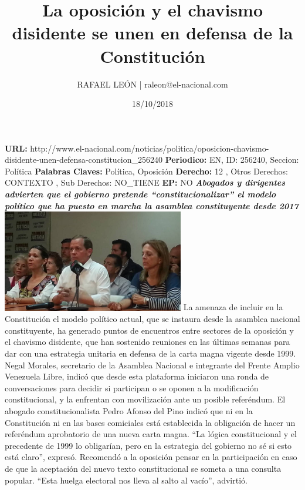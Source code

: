 \documentclass{article}%
\title{\textbf{La oposición y el chavismo disidente se unen en defensa de la Constitución}}%
\author{RAFAEL LEÓN | raleon@el{-}nacional.com}%
\date{18/10/2018}%
\begin{document}
%
\normalsize%
\maketitle%
\textbf{URL: }%
http://www.el{-}nacional.com/noticias/politica/oposicion{-}chavismo{-}disidente{-}unen{-}defensa{-}constitucion\_256240\newline%
%
\textbf{Periodico: }%
EN, %
ID: %
256240, %
Seccion: %
Política\newline%
%
\textbf{Palabras Claves: }%
Política, Oposición\newline%
%
\textbf{Derecho: }%
12%
, Otros Derechos: %
CONTEXTO%
, Sub Derechos: %
NO\_TIENE%
\newline%
%
\textbf{EP: }%
NO\newline%
\newline%
%
\textbf{\textit{Abogados y dirigentes advierten que el gobierno pretende “constitucionalizar” el modelo político que ha puesto en marcha la asamblea constituyente desde 2017}}%
\newline%
\newline%
%
\includegraphics[width=300px]{98.jpg}%
\newline%
%
La amenaza de incluir en la Constitución el modelo político actual, que se instaura desde la asamblea nacional constituyente, ha generado puntos de encuentros entre sectores de la oposición y el chavismo disidente, que han sostenido reuniones en las últimas semanas para dar con una estrategia unitaria en defensa de la carta magna vigente desde 1999.%
\newline%
%
Negal Morales, secretario de la Asamblea Nacional e integrante del Frente Amplio Venezuela Libre, indicó que desde esta plataforma iniciaron una ronda de conversaciones para decidir si participan o se oponen a la modificación constitucional, y la enfrentan con movilización ante un posible referéndum.%
\newline%
%
El abogado constitucionalista Pedro Afonso del Pino indicó que ni en la Constitución ni en las bases comiciales está establecida la obligación de hacer un referéndum aprobatorio de una nueva carta magna. “La lógica constitucional y el precedente de 1999 lo obligarían, pero en la estrategia del gobierno no sé si esto está claro”, expresó. Recomendó a la oposición pensar en la participación en caso de que la aceptación del nuevo texto constitucional se someta a una consulta popular. “Esta huelga electoral nos lleva al salto al vacío”, advirtió.%
\end{document}

